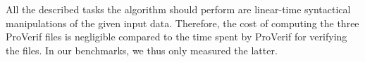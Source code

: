 All the described tasks the algorithm should perform are linear-time syntactical manipulations of the given
input data. Therefore, the cost of computing the three ProVerif files is negligible compared to
the time spent by ProVerif for verifying the files. In our benchmarks, we thus only measured the latter.









